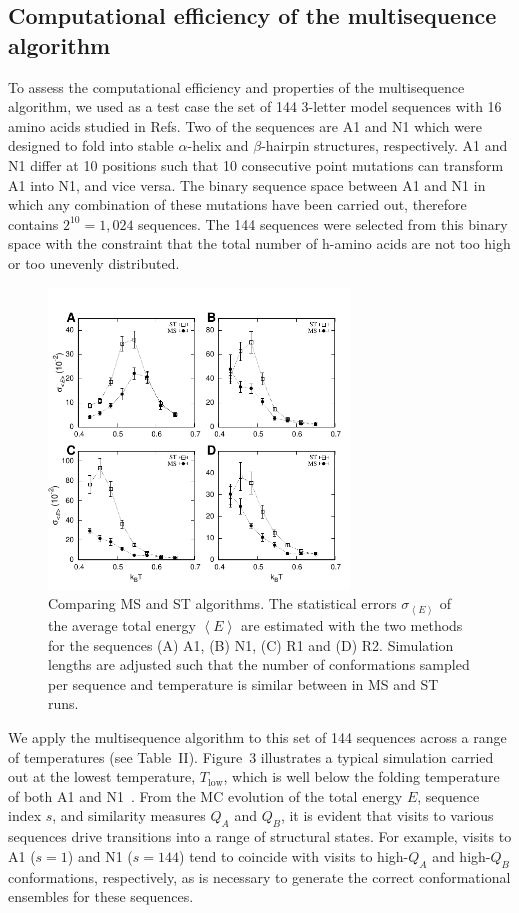 \documentclass[
aip,
rsi,%
amsmath,amssymb,
reprint,%
]{revtex4-1}
\newcommand	 {\sbar}	{{s}}
\newcommand	 {\Tlow}	{{T_\mathrm{low}}}
\begin{document}
\subsection{Computational efficiency of the multisequence algorithm}
\noindent
To assess the computational efficiency and properties of the multisequence algorithm, we used as a test case the set of 144 3-letter model sequences with 16 amino acids studied in Refs.\cite{Holzgrafe2014} Two of the sequences are A1 and N1 which were designed to fold into stable $\alpha$-helix and $\beta$-hairpin structures, respectively. A1 and N1 differ at 10 positions such that 10 consecutive point mutations can transform A1 into N1, and vice versa. The binary sequence space between A1 and N1 in which any combination of these mutations have been carried out, therefore contains $2^{10}=1,024$ sequences. The 144 sequences were selected from this binary space with the constraint that the total number of h-amino acids are not too high or too unevenly distributed.~\cite{Holzgrafe2014}

\begin{figure}
\includegraphics[width=8.0cm]{Stderr}
\caption{Comparing MS and ST algorithms. The statistical errors $\sigma_{\left < E\right >}$ of the average total energy $\left < E\right >$ are estimated with the two methods for the sequences (A) A1, (B) N1, (C) R1 and (D) R2. Simulation lengths are adjusted such that the number of conformations sampled per sequence and temperature is similar between in MS and ST runs. }
\end{figure}


We apply the multisequence algorithm to this set of 144 sequences across a range of temperatures (see Table~II). Figure~3 illustrates a typical simulation carried out at the lowest temperature, $\Tlow$, which is well below the folding temperature of both A1 and N1~\cite{Holzgrafe2014,Holzgrafe2015}. From the MC evolution of the total energy $E$, sequence index $\sbar$, and similarity measures $Q_A$ and $Q_B$, it is evident that visits to various sequences drive transitions into a range of structural states. For example, visits to A1 ($\sbar=1$) and N1 ($\sbar=144$) tend to coincide with visits to high-$Q_A$ and high-$Q_B$ conformations, respectively, as is necessary to generate the correct conformational ensembles for these sequences.
\end{document}
